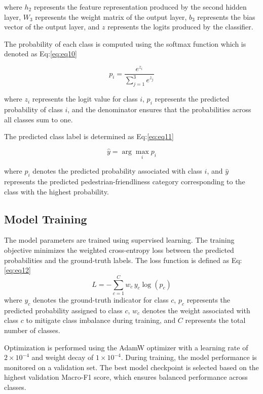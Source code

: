 \documentclass[11pt]{article}
\begin{document}
\noindent where \(h_2\) represents the feature representation produced by the second hidden layer, \(W_3\) represents the weight matrix of the output layer, \(b_3\) represents the bias vector of the output layer, and \(z\) represents the logits produced by the classifier.

\noindent The probability of each class is computed using the softmax function which is denoted as Eq:\ref{eq:eq10}

\begin{equation}
p_i = \frac{e^{z_i}}{\sum_{j=1}^{3} e^{z_j}}
\label{eq:eq10}
\end{equation}

\noindent where \(z_i\) represents the logit value for class \(i\), \(p_i\) represents the predicted probability of class \(i\), and the denominator ensures that the probabilities across all classes sum to one.

\noindent The predicted class label is determined as Eq:\ref{eq:eq11}

\begin{equation}
\hat{y} = \arg\max_i p_i
\label{eq:eq11}
\end{equation}

\noindent where \(p_i\) denotes the predicted probability associated with class \(i\), and \(\hat{y}\) represents the predicted pedestrian-friendliness category corresponding to the class with the highest probability.

\subsection{Model Training}

The model parameters are trained using supervised learning. The training objective minimizes the weighted cross-entropy loss between the predicted probabilities and the ground-truth labels. The loss function is defined as Eq:\ref{eq:eq12}
\begin{equation}
L = - \sum_{c=1}^{C} w_c \, y_c \log(p_c)
\label{eq:eq12}
\end{equation}
\noindent where \(y_c\) denotes the ground-truth indicator for class \(c\), \(p_c\) represents the predicted probability assigned to class \(c\), \(w_c\) denotes the weight associated with class \(c\) to mitigate class imbalance during training, and \(C\) represents the total number of classes.

\noindent Optimization is performed using the AdamW optimizer with a learning rate of \(2 \times 10^{-4}\) and weight decay of \(1 \times 10^{-4}\). During training, the model performance is monitored on a validation set. The best model checkpoint is selected based on the highest validation Macro-F1 score, which ensures balanced performance across classes.
\end{document}
